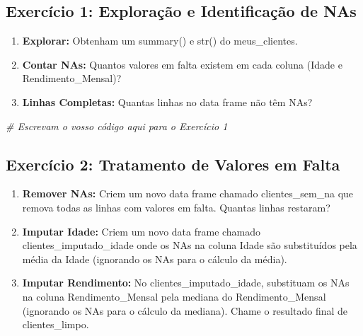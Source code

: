 \documentclass[
]{article}
\newenvironment{Shaded}{\begin{snugshade}}{\end{snugshade}}
\newcommand{\CommentTok}[1]{\textcolor[rgb]{0.56,0.35,0.01}{\textit{#1}}}
\providecommand{\tightlist}{%
  \setlength{\itemsep}{0pt}\setlength{\parskip}{0pt}}
\begin{document}
\subsection{\texorpdfstring{\textbf{Exercício 1:} Exploração e
Identificação de
NAs}{Exercício 1: Exploração e Identificação de NAs}}\label{exercuxedcio-1-explorauxe7uxe3o-e-identificauxe7uxe3o-de-nas}

\begin{enumerate}
\def\labelenumi{\arabic{enumi}.}
\tightlist
\item
  \textbf{Explorar:} Obtenham um summary() e str() do meus\_clientes.
\item
  \textbf{Contar NAs:} Quantos valores em falta existem em cada coluna
  (Idade e Rendimento\_Mensal)?
\item
  \textbf{Linhas Completas:} Quantas linhas no data frame não têm NAs?
\end{enumerate}

\begin{Shaded}
\begin{Highlighting}[]
\CommentTok{\# Escrevam o vosso código aqui para o Exercício 1}
\end{Highlighting}
\end{Shaded}

\subsection{\texorpdfstring{\textbf{Exercício 2:} Tratamento de Valores
em
Falta}{Exercício 2: Tratamento de Valores em Falta}}\label{exercuxedcio-2-tratamento-de-valores-em-falta}

\begin{enumerate}
\def\labelenumi{\arabic{enumi}.}
\tightlist
\item
  \textbf{Remover NAs:} Criem um novo data frame chamado
  clientes\_sem\_na que remova todas as linhas com valores em falta.
  Quantas linhas restaram?
\item
  \textbf{Imputar Idade:} Criem um novo data frame chamado
  clientes\_imputado\_idade onde os NAs na coluna Idade são substituídos
  pela média da Idade (ignorando os NAs para o cálculo da média).
\item
  \textbf{Imputar Rendimento:} No clientes\_imputado\_idade, substituam
  os NAs na coluna Rendimento\_Mensal pela mediana do Rendimento\_Mensal
  (ignorando os NAs para o cálculo da mediana). Chame o resultado final
  de clientes\_limpo.
\end{enumerate}
\end{document}
